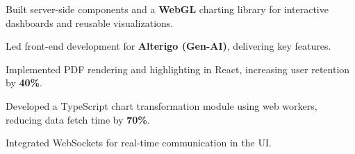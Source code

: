 
\begin{resumeitemize}
    \item Built server-side components and a \textbf{WebGL} charting library for interactive dashboards and reusable visualizations.
    \item Led front-end development for \textbf{Alterigo (Gen-AI)}, delivering key features.
    \item Implemented PDF rendering and highlighting in React, increasing user retention by \textbf{40\%}.
    \item Developed a TypeScript chart transformation module using web workers, reducing data fetch time by \textbf{70\%}.
    \item Integrated WebSockets for real-time communication in the UI.
\end{resumeitemize}
